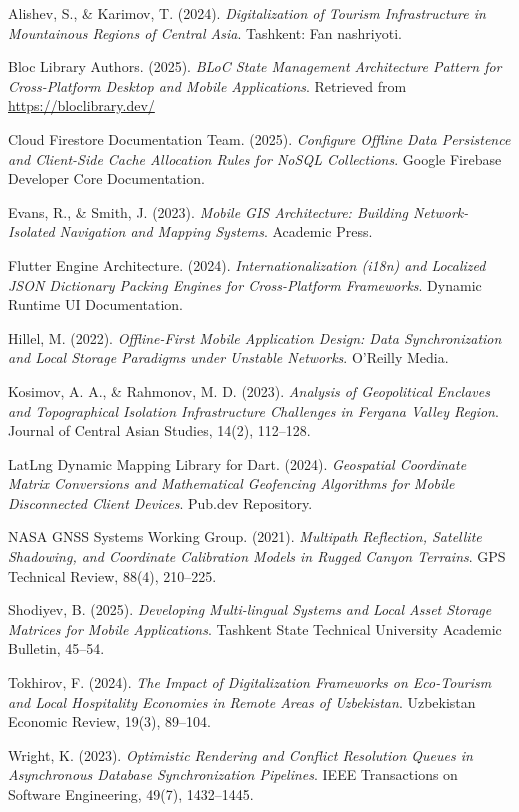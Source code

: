 \documentclass[12pt,a4paper,oneside]{report}
\begin{document}
\begin{enumerate}[leftmargin=2em,label={[\arabic*]}]
  \item Alishev, S., \& Karimov, T. (2024). \emph{Digitalization of Tourism Infrastructure
        in Mountainous Regions of Central Asia}. Tashkent: Fan nashriyoti.
  \item Bloc Library Authors. (2025). \emph{BLoC State Management Architecture Pattern for
        Cross-Platform Desktop and Mobile Applications}. Retrieved from
        \url{https://bloclibrary.dev/}
  \item Cloud Firestore Documentation Team. (2025). \emph{Configure Offline Data
        Persistence and Client-Side Cache Allocation Rules for NoSQL Collections}. Google
        Firebase Developer Core Documentation.
  \item Evans, R., \& Smith, J. (2023). \emph{Mobile GIS Architecture: Building
        Network-Isolated Navigation and Mapping Systems}. Academic Press.
  \item Flutter Engine Architecture. (2024). \emph{Internationalization (i18n) and Localized
        JSON Dictionary Packing Engines for Cross-Platform Frameworks}. Dynamic Runtime UI
        Documentation.
  \item Hillel, M. (2022). \emph{Offline-First Mobile Application Design: Data
        Synchronization and Local Storage Paradigms under Unstable Networks}. O'Reilly Media.
  \item Kosimov, A. A., \& Rahmonov, M. D. (2023). \emph{Analysis of Geopolitical Enclaves
        and Topographical Isolation Infrastructure Challenges in Fergana Valley Region}.
        Journal of Central Asian Studies, 14(2), 112--128.
  \item LatLng Dynamic Mapping Library for Dart. (2024). \emph{Geospatial Coordinate Matrix
        Conversions and Mathematical Geofencing Algorithms for Mobile Disconnected Client
        Devices}. Pub.dev Repository.
  \item NASA GNSS Systems Working Group. (2021). \emph{Multipath Reflection, Satellite
        Shadowing, and Coordinate Calibration Models in Rugged Canyon Terrains}. GPS
        Technical Review, 88(4), 210--225.
  \item Shodiyev, B. (2025). \emph{Developing Multi-lingual Systems and Local Asset Storage
        Matrices for Mobile Applications}. Tashkent State Technical University Academic
        Bulletin, 45--54.
  \item Tokhirov, F. (2024). \emph{The Impact of Digitalization Frameworks on Eco-Tourism
        and Local Hospitality Economies in Remote Areas of Uzbekistan}. Uzbekistan Economic
        Review, 19(3), 89--104.
  \item Wright, K. (2023). \emph{Optimistic Rendering and Conflict Resolution Queues in
        Asynchronous Database Synchronization Pipelines}. IEEE Transactions on Software
        Engineering, 49(7), 1432--1445.
\end{enumerate}
\end{document}

